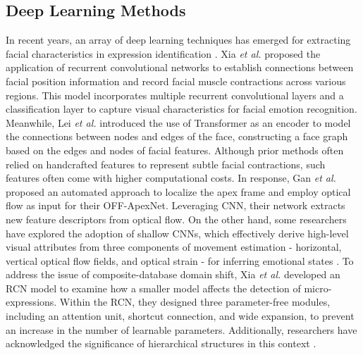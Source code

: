 \documentclass[review,12pt, 3p]{elsarticle}
\begin{document}
\subsection{Deep Learning Methods}
In recent years, an array of deep learning techniques has emerged for extracting facial characteristics in expression identification \cite{ref-33, zhang2015facial, zhang2017facial, niu2022four}. Xia \textit{et al.} \cite{ref-32} proposed the application of recurrent convolutional networks to establish connections between facial position information and record facial muscle contractions across various regions. This model incorporates multiple recurrent convolutional layers and a classification layer to capture visual characteristics for facial emotion recognition. Meanwhile, Lei \textit{et al.} \cite{ref-33} introduced the use of Transformer as an encoder to model the connections between nodes and edges of the face, constructing a face graph based on the edges and nodes of facial features. Although prior methods often relied on handcrafted features to represent subtle facial contractions, such features often come with higher computational costs. In response, Gan \textit{et al.} \cite{ref-9} proposed an automated approach to localize the apex frame and employ optical flow as input for their OFF-ApexNet. Leveraging CNN, their network extracts new feature descriptors from optical flow. On the other hand, some researchers have explored the adoption of shallow CNNs, which effectively derive high-level visual attributes from three components of movement estimation - horizontal, vertical optical flow fields, and optical strain - for inferring emotional states \cite{ref-5}. To address the issue of composite-database domain shift, Xia \textit{et al.} \cite{ref-6} developed an RCN model to examine how a smaller model affects the detection of micro-expressions. Within the RCN, they designed three parameter-free modules, including an attention unit, shortcut connection, and wide expansion, to prevent an increase in the number of learnable parameters. Additionally, researchers have acknowledged the significance of hierarchical structures in this context \cite{ref-45}.\\
\end{document}

